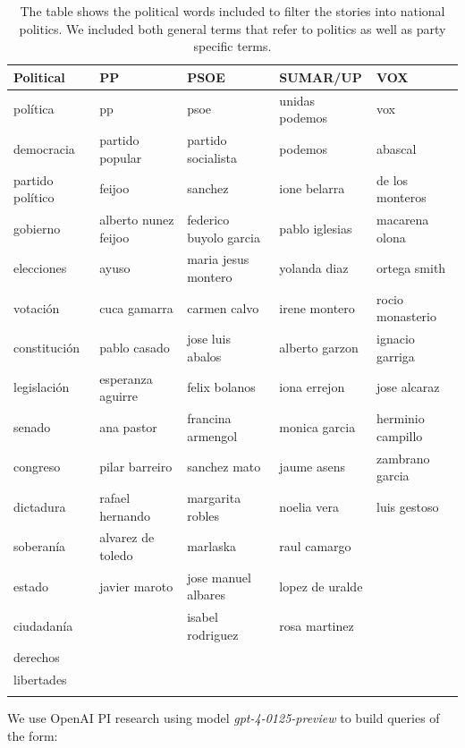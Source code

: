 \documentclass[12pt]{article}
\begin{document}
	\begin{longtable}{|l|l|l|l|l|}
		\hline
		\textbf{Political} & \textbf{PP} & \textbf{PSOE} & \textbf{SUMAR/UP} & \textbf{VOX} \\
		\hline
		política & pp & psoe & unidas podemos & vox \\
		democracia & partido popular & partido socialista & podemos & abascal \\
		partido político & feijoo & sanchez & ione belarra &de los monteros \\
		gobierno & alberto nunez feijoo & federico buyolo garcia & pablo iglesias & macarena olona \\
		elecciones & ayuso & maria jesus montero & yolanda diaz & ortega smith \\
		votación & cuca gamarra & carmen calvo & irene montero & rocio monasterio \\
		constitución & pablo casado & jose luis abalos & alberto garzon & ignacio garriga \\
		legislación & esperanza aguirre & felix bolanos & iona errejon &jose alcaraz \\
		senado & ana pastor & francina armengol & monica garcia & herminio campillo \\
		congreso & pilar barreiro & sanchez mato & jaume asens & zambrano garcia \\
		dictadura & rafael hernando & margarita robles & noelia vera & luis gestoso \\
		soberanía &alvarez de toledo & marlaska & raul camargo & \\
		estado & javier maroto & jose manuel albares &lopez de uralde & \\
		ciudadanía &  & isabel rodriguez & rosa martinez & \\
		derechos &  &  &  & \\
		libertades &  &  &  & \\
		\hline
		\caption{The table shows the political words included to filter the stories into national politics. We included both general terms that refer to politics as well as party specific terms.}
		\label{table:politics}
	\end{longtable}
	
	
	
	We use OpenAI PI research  using model \textit{gpt-4-0125-preview} to build queries of the form: 
	
\end{document}
